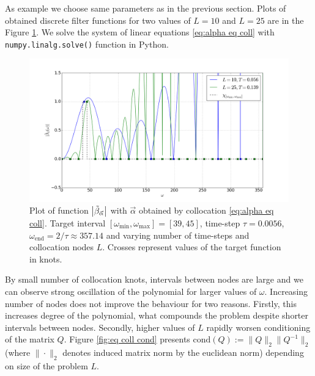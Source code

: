 \documentclass[a4paper,11pt,bibliography=totoc,listof=totoc,headinclude=true,cleardoublepage=empty,oneside]{scrbook}
\newcommand{\dffv}{\Tilde{\beta}_{\Vec{\alpha}}}
\newcommand{\e}{\mathrm{end}}
\begin{document}
As example we choose same parameters as in the previous section. Plots of obtained discrete filter functions for two values of $L = 10 $ and $L=25$ are in the Figure \ref{fig:eq coll beta}. We solve the system of linear equations \eqref{eq:alpha eq coll} with \texttt{numpy.linalg.solve()} function in Python. 

\begin{figure}[h]
    \centering
    \includegraphics[width=1\linewidth]{latex//images//equi_coll/Figure_1.png}
    \caption{Plot of function $\left|\dffv\right|$ with $\Vec{\alpha}$ obtained by collocation \eqref{eq:alpha eq coll}. Target interval $\left[\omega_{\min}, \omega_{\max} \right] = [39, 45]$, time-step $\tau = 0.0056$, $\omega_\e = 2/\tau \approx 357.14$ and varying number of time-steps and collocation nodes $L$. Crosses represent values of the target function in knots. }
    \label{fig:eq coll beta}
\end{figure}

By small number of collocation knots, intervals between nodes are large and we can observe strong oscillation of the polynomial for larger values of $\omega$. Increasing number of nodes does not improve the behaviour for two reasons. Firstly, this increases degree of the polynomial, what compounds the problem despite shorter intervals between nodes. Secondly, higher values of $L$ rapidly worsen conditioning of the matrix $Q$. Figure \ref{fig:eq coll cond} presents $\mathrm{cond}(Q) := \|Q\|_2 \|Q^{-1}\|_2$ (where $\| \cdot \|_2$ denotes induced matrix norm by the euclidean norm) depending on size of the problem $L$.
\end{document}
